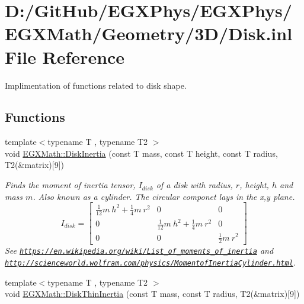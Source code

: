 \hypertarget{_disk_8inl}{}\section{D\+:/\+Git\+Hub/\+E\+G\+X\+Phys/\+E\+G\+X\+Phys/\+E\+G\+X\+Math/\+Geometry/3\+D/\+Disk.inl File Reference}
\label{_disk_8inl}


Implimentation of functions related to disk shape.  


\subsection*{Functions}
\begin{DoxyCompactItemize}
\item 
{\footnotesize template$<$typename T , typename T2 $>$ }\\void \mbox{\hyperlink{group___e_g_x_math-_geometry-3_d-_disk_ga6ed461694b277e36a641a6550bdea68f}{E\+G\+X\+Math\+::\+Disk\+Inertia}} (const T mass, const T height, const T radius, T2(\&matrix)\mbox{[}9\mbox{]})
\begin{DoxyCompactList}\small\item\em Finds the moment of inertia tensor, $I_{disk}$ of a disk with radius, $r$, height, $h$ and mass $m$. Also known as a cylinder. The circular componet lays in the x,y plane. \[ I_{disk}=\begin{bmatrix} \frac{1}{12}m\ h^2 + \frac{1}{4}m\ r^2 & 0 & 0\\ 0 & \frac{1}{12}m\ h^2 + \frac{1}{4}m\ r^2 & 0\\ 0 & 0 & \frac{1}{2}m\ r^2 \end{bmatrix} \] See \href{https://en.wikipedia.org/wiki/List_of_moments_of_inertia}{\tt https\+://en.\+wikipedia.\+org/wiki/\+List\+\_\+of\+\_\+moments\+\_\+of\+\_\+inertia} and \href{http://scienceworld.wolfram.com/physics/MomentofInertiaCylinder.html}{\tt http\+://scienceworld.\+wolfram.\+com/physics/\+Momentof\+Inertia\+Cylinder.\+html}. \end{DoxyCompactList}\item 
{\footnotesize template$<$typename T , typename T2 $>$ }\\void \mbox{\hyperlink{group___e_g_x_math-_geometry-3_d-_disk_ga8dcadf6cd5680294a84311c6767e3caf}{E\+G\+X\+Math\+::\+Disk\+Thin\+Inertia}} (const T mass, const T radius, T2(\&matrix)\mbox{[}9\mbox{]})

\end{DoxyCompactItemize}

